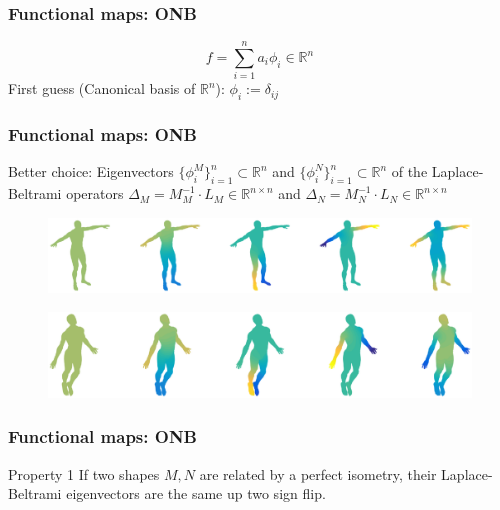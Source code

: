 \documentclass[compress]{beamer}
\begin{document}
\begin{frame}[fragile]
\frametitle{Functional maps: ONB}
$$
	f = \sum_{i=1}^{n} a_i\phi_i \in \mathbb{R}^n
$$
First guess (Canonical basis of $\mathbb{R}^n$): $\phi_i := \delta_{ij}$ \\

\end{frame}

\begin{frame}[fragile]
\frametitle{Functional maps: ONB}
Better choice:
Eigenvectors $\{\phi^M_i\}_{i=1}^n \subset \mathbb{R}^n$ and $\{\phi^N_i\}_{i=1}^n \subset \mathbb{R}^n$ of the Laplace-Beltrami operators $\Delta_M=M_M^{-1} \cdot L_M \in \mathbb{R}^{n \times n}$ and $\Delta_N=M_N^{-1} \cdot L_N \in \mathbb{R}^{n \times n}$
\begin{figure}[h]
	\centering
	\includegraphics[width=1.0\textwidth]{Michael.eps}
\end{figure}
  \begin{figure}[h]
	\centering
	\includegraphics[width=1.0\textwidth]{Michael1.eps}
\end{figure}

\end{frame}

\begin{frame}[fragile]
\frametitle{Functional maps: ONB}
\begin{block}{Property 1}
If two shapes $M, N$ are related by a perfect isometry, their Laplace-Beltrami eigenvectors are the same up two sign flip.
\end{block}
\end{frame}
\end{document}
